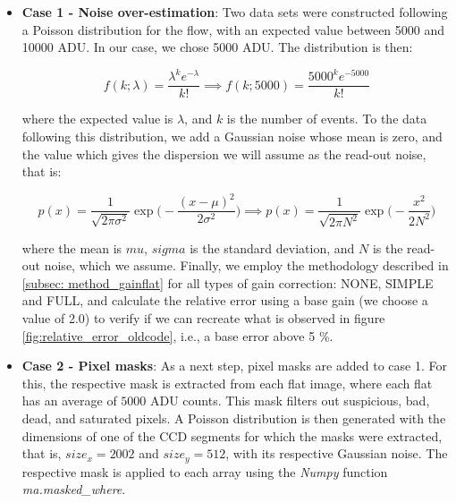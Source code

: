\begin{itemize}
    \item \textbf{Case 1 - Noise over-estimation}: Two data sets were constructed following a Poisson distribution for the flow, with an expected value between 5000 and 10000 ADU. In our case, we chose 5000 ADU. The distribution is then:
    
    
    \begin{equation}
        f(k;\lambda) = \frac{\lambda^k e^{-\lambda}}{k!} \implies f(k;5000) = \frac{5000^k e^{-5000}}{k!}
    \end{equation}
    \label{eq:dist_Poisson}
    
    
where the expected value is $\lambda$, and $k$ is the number of events. To the data following this distribution, we add a Gaussian noise whose mean is zero, and the value which gives the dispersion we will assume as the read-out noise, that is:

\begin{equation}
    p(x) = \frac{1}{\sqrt{2 \pi \sigma^2}} \exp \Big(-\frac{(x - \mu)^2}{2\sigma^2} \Big) \implies p(x) = \frac{1}{\sqrt{2 \pi N^2}} \exp \Big(-\frac{x^2}{2N^2} \Big)
    \label{eq:gaussian_noise}
\end{equation}

where the mean is $mu$, $sigma$ is the standard deviation, and $N$ is the read-out noise, which we assume. Finally, we employ the methodology described in \ref{subsec: method_gainflat} for all types of gain correction: NONE, SIMPLE and FULL, and calculate the relative error using a base gain (we choose a value of 2.0) to verify if we can recreate what is observed in figure \ref{fig:relative_error_oldcode}, i.e., a base error above 5 \%.

\item \textbf{Case 2 - Pixel masks}: As a next step, pixel masks are added to case 1. For this, the respective mask is extracted from each flat image, where each flat has an average of $5000$ ADU counts. This mask filters out suspicious, bad, dead, and saturated pixels. A Poisson distribution is then generated with the dimensions of one of the CCD segments for which the masks were extracted, that is, $size_x = 2002$ and $size_y = 512$, with its respective Gaussian noise. The respective mask is applied to each array using the \textit{Numpy} function \citep{harris2020array} \textit{ma.masked\_where}.



\end{itemize}
